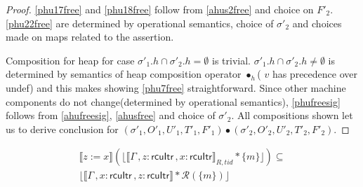 \begin{proof}
\ref{phu17free} and \ref{phu18free} follow from \ref{ahus2free} and choice on $F'_2$. \ref{phu22free} are determined by operational semantics, choice of $\sigma'_2$ and choices made on maps related to the assertion.

Composition for heap for case $\sigma'_1.h \cap \sigma'_2.h = \emptyset$ is trivial. $\sigma'_1.h \cap \sigma'_2.h \neq \emptyset$ is determined by semantics of heap composition operator $\bullet_h$( $v$ has precedence over \textsf{undef}) and this makes showing \ref{phu7free} straightforward. Since other machine components do not change(determined by operational semantics), \ref{phufreesig} follows from \ref{ahufreesig}, \ref{ahusfree} and choice of $\sigma'_2$. All compositions shown let us to derive conclusion for  $(\sigma'_1, O'_1, U'_1, T'_1,F'_1) \bullet (\sigma'_2, O'_2, U'_2, T'_2,F'_2) $.
 \end{proof} 
  \begin{lemma}
   \label{lemma:rreadstack}
\begin{align*}
  \llbracket z:=x \rrbracket (\lfloor \llbracket \Gamma\,, z:\textsf{rcuItr}\, , x:\textsf{rcuItr} \rrbracket_{R,tid} * \{m\}\rfloor)  \subseteq \\
                                                              \lfloor \llbracket \Gamma\,, x:\textsf{rcuItr} \, , z:\textsf{rcuItr}  \rrbracket  * \mathcal{R}(\{m\})\rfloor
\end{align*}
 \end{lemma}
